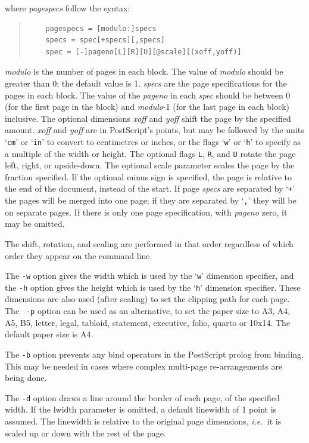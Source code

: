 \documentclass[twoside,11pt]{article}
\begin{document}
\begin{itemize}
where {\em pagespecs} follow the syntax:

\small
\begin{quote}
\begin{verbatim}
    pagespecs = [modulo:]specs
    specs = spec[+specs][,specs]
    spec = [-]pageno[L][R][U][@scale][(xoff,yoff)]
\end{verbatim}
\end{quote}
\normalsize

{\em modulo} is the number of pages in each block. The value of {\em
modulo} should be greater than 0; the default value is 1. {\em specs}
are the page specifications for the pages in each block. The value of
the {\em pageno} in each {\em spec} should be between 0 (for the first
page in the block) and {\em modulo}-1 (for the last page in each
block) inclusive. The optional dimensions {\em xoff} and {\em yoff}
shift the page by the specified amount. {\em xoff} and {\em yoff} are
in PostScript's points, but may be followed by the units `{\tt cm}' or
`{\tt in}' to convert to centimetres or inches, or the flags `{\tt w}'
or `{\tt h}' to specify as a multiple of the width or height. The
optional flags {\tt L}, {\tt R}, and {\tt U} rotate the page left,
right, or upside-down. The optional scale parameter scales the page by
the fraction specified. If the optional minus sign is specified, the
page is relative to the end of the document, instead of the start. If
page {\em specs} are separated by `{\tt +}' the pages will be merged
into one page; if they are separated by `{\tt ,}' they will be on
separate pages. If there is only one page specification, with {\em
pageno} zero, it may be omitted.

The shift, rotation, and scaling are performed in that order
regardless of which order they appear on the command line.

The {\tt -w} option gives the width which is used by the `{\tt w}'
dimension specifier, and the {\tt -h} option gives the height which is
used by the `{\tt h}' dimension specifier. These dimensions are also
used (after scaling) to set the clipping path for each page. The {\tt
-p} option can be used as an alternative, to set the paper size to A3,
A4, A5, B5, letter, legal, tabloid, statement, executive, folio,
quarto or 10x14. The default paper size is A4.

The {\tt -b} option prevents any bind operators in the PostScript
prolog from binding. This may be needed in cases where complex
multi-page re-arrangements are being done.

The {\tt -d} option draws a line around the border of each page, of
the specified width. If the lwidth parameter is omitted, a default
linewidth of 1 point is assumed. The linewidth is relative to the
original page dimensions, {\em i.e.\ }it is scaled up or down with the
rest of the page.


\end{itemize}
\end{document}
